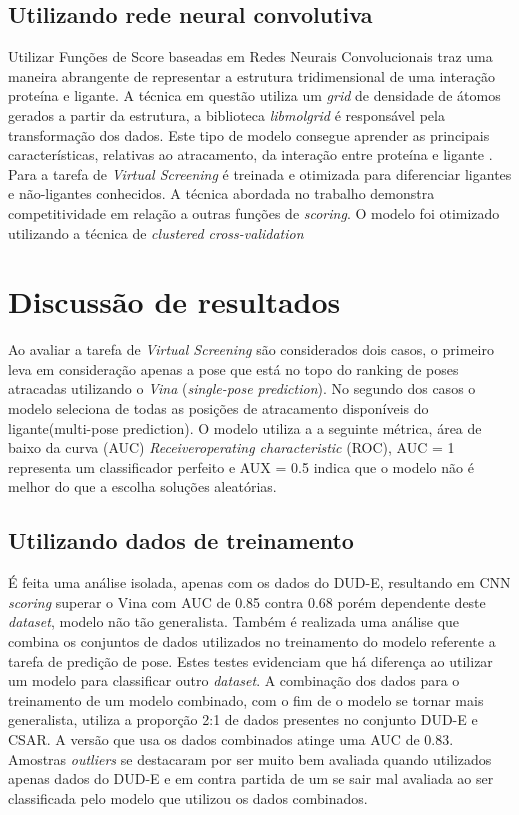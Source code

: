 \documentclass[utf8]{frontiersSCNS} %
\begin{document}
\subsection{Utilizando rede neural convolutiva}
Utilizar Funções de Score baseadas em Redes Neurais Convolucionais traz uma maneira abrangente de representar a estrutura tridimensional de uma interação proteína e ligante. A técnica em questão utiliza um \textit{grid} de densidade de átomos \cite{plscnn} gerados a partir da estrutura, a biblioteca \textit{libmolgrid} \cite{sunseri2019libmolgridgpuacceleratedmolecular} é responsável pela transformação dos dados. Este tipo de modelo consegue aprender as principais características, relativas ao atracamento, da interação entre proteína e ligante \cite{plscnn}. Para a tarefa de \textit{Virtual Screening} é treinada e otimizada para diferenciar ligantes e não-ligantes conhecidos. A técnica abordada no trabalho demonstra competitividade em relação a outras funções de \textit{scoring}. O modelo foi otimizado utilizando a técnica de \textit{clustered cross-validation}


\section{Discussão de resultados}

Ao avaliar a tarefa de \textit{Virtual Screening} são considerados dois casos, o primeiro leva em consideração apenas a pose que está no topo do ranking de poses atracadas utilizando o \textit{Vina}\cite{smina} (\textit{single-pose prediction}). No segundo dos casos o modelo seleciona de todas as posições de atracamento disponíveis do ligante(multi-pose prediction). O modelo utiliza a a seguinte métrica, área de baixo da curva (AUC) \textit{Receiveroperating characteristic} (ROC),  AUC = 1 representa um classificador perfeito e AUX = 0.5 indica que o modelo não é melhor do que a escolha soluções aleatórias.

\subsection{Utilizando dados de treinamento}
É feita uma análise isolada, apenas com os dados do DUD-E\cite{Mysinger2012DUDE}, resultando em CNN \textit{scoring} superar o Vina com AUC de 0.85 contra 0.68 porém dependente deste \textit{dataset}, modelo não tão generalista. Também é realizada uma análise que combina os conjuntos de dados utilizados no treinamento do modelo referente a tarefa de predição de pose. Estes testes evidenciam que há diferença ao utilizar um modelo para classificar outro \textit{dataset}. A combinação dos dados para o treinamento de um modelo combinado, com o fim de o modelo se tornar mais generalista, utiliza a proporção 2:1 de dados presentes no conjunto DUD-E e CSAR\cite{dunbar2011csar}. A versão que usa os dados combinados atinge uma AUC de 0.83. Amostras \textit{outliers} se destacaram por ser muito bem avaliada quando utilizados apenas dados do DUD-E e em contra partida de um se sair mal avaliada ao ser classificada pelo modelo que utilizou os dados combinados. 
\end{document}
